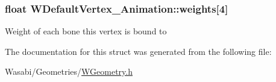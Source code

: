 \subsubsection[{\texorpdfstring{weights}{weights}}]{\setlength{\rightskip}{0pt plus 5cm}float W\+Default\+Vertex\+\_\+\+Animation\+::weights\mbox{[}4\mbox{]}}\hypertarget{struct_w_default_vertex___animation_a613ad40e58354add4283cf2fa5b14563}{}\label{struct_w_default_vertex___animation_a613ad40e58354add4283cf2fa5b14563}
Weight of each bone this vertex is bound to 

The documentation for this struct was generated from the following file\+:\begin{DoxyCompactItemize}
\item 
Wasabi/\+Geometries/\hyperlink{_w_geometry_8h}{W\+Geometry.\+h}\end{DoxyCompactItemize}
